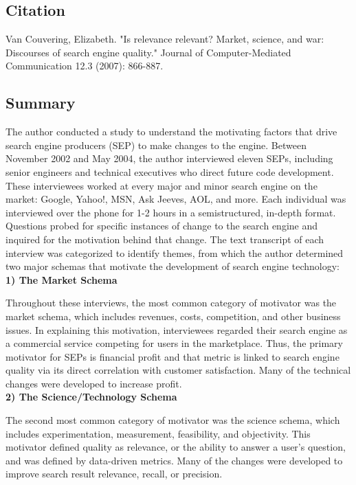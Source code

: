 \documentclass[../main-paper.tex]{subfiles}
\begin{document}
\subsection{Citation}
Van Couvering, Elizabeth. "Is relevance relevant? Market, science, and war: Discourses of search engine quality." Journal of Computer-Mediated Communication 12.3 (2007): 866-887.

\subsection{Summary}
The author conducted a study to understand the motivating factors that drive search engine producers (SEP) to make changes to the engine. Between November 2002 and May 2004, the author interviewed eleven SEPs, including senior engineers and technical executives who direct future code development. These interviewees worked at every major and minor search engine on the market:  Google, Yahoo!, MSN, Ask Jeeves, AOL, and more. Each individual was interviewed over the phone for 1-2 hours in a semistructured, in-depth format. Questions probed for specific instances of change to the search engine and inquired for the motivation behind that change. The text transcript of each interview was categorized to identify themes, from which the author determined two major schemas that motivate the development of search engine technology:\\

\textbf{1) The Market Schema}

Throughout these interviews, the most common category of motivator was the market schema, which includes revenues, costs, competition, and other business issues. In explaining this motivation, interviewees regarded their search engine as a commercial service competing for users in the marketplace. Thus, the primary motivator for SEPs is financial profit and that metric is linked to search engine quality via its direct correlation with customer satisfaction. Many of the technical changes were developed to increase profit.\\

\textbf{2) The Science/Technology Schema}

The second most common category of motivator was the science schema, which includes experimentation, measurement, feasibility, and objectivity. This motivator defined quality as relevance, or the ability to answer a user's question, and was defined by data-driven metrics. Many of the changes were developed to improve search result relevance, recall, or precision.\\
\end{document}
